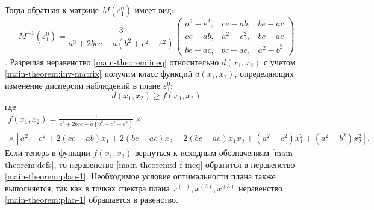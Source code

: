 	Тогда обратная к матрице $M(\varepsilon_1^0)$ имеет вид:
	\begin{equation} \label{main-theorem:inv-matrix}
		M^{-1}(\varepsilon_1^0) = \frac 3 {a^3 + 2 b c e - a(b^2 + c^2 + e^2)}
		\begin{pmatrix}
			a^2 - e^2,& ce - ab, & be - ac\\
			ce - ab,& a^2-c^2,& bc-ae\\
			be - ac,& bc - ae,& a^2 - b^2			
		\end{pmatrix} 
	\end{equation}.
	Разрешая неравенство \eqref{main-theorem:ineq} относительно $d(x_1, x_2)$ с учетом \eqref{main-theorem:inv-matrix} получим класс функций $d(x_1, x_2)$, определяющих изменение
	дисперсии наблюдений в плане $\varepsilon_1^0$:
	\begin{equation} \label{main-theorem:d-f-ineq}
		d(x_1, x_2) \ge f(x_1, x_2)
	\end{equation}
	где
	\begin{multline}
		f(x_1, x_2) =
			\frac {1}{a^3 + 2bce - a(b^2+c^2+e^2)} \times \\
		\times [{a^2 - e^2 +2(ce - ab)x_1 + 2(be-ac)x_2 + 2(bc - ae)x_1 x_2 + (a^2 - c^2)x_1^2 + (a^2 - b^2)x_2^2}].		
	\end{multline}
	Если теперь в функции $f(x_1, x_2)$ вернуться к исходным обозначениям \eqref{main-theorem:defs}, то неравенство \eqref{main-theorem:d-f-ineq} обратится в неравенство \eqref{main-theorem:plan-1}. Необходимое условие оптимальности плана также выполняется, так как в точках спектра плана $x^{(1)}, x^{(2)}, x^{(3)}$  неравенство \eqref{main-theorem:plan-1} обращается в равенство.
	
